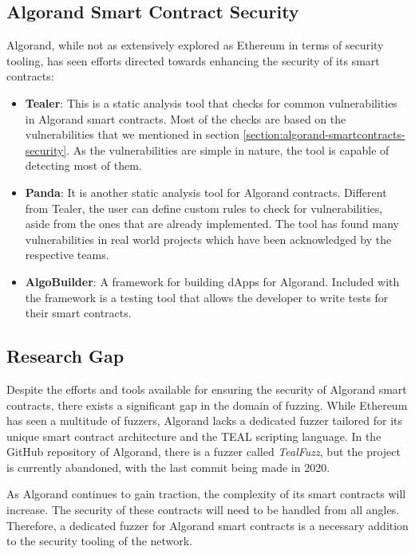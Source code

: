 \subsection*{Algorand Smart Contract Security}
Algorand, while not as extensively explored as Ethereum in terms of security tooling, has seen efforts directed towards enhancing the security of its smart contracts:
\begin{itemize}
    \item \textbf{Tealer}: This is a static analysis tool that checks for common vulnerabilities in Algorand smart contracts.
          Most of the checks are based on the vulnerabilities that we mentioned in section \ref{section:algorand-smartcontracts-security}.
          As the vulnerabilities are simple in nature, the tool is capable of detecting most of them.

    \item \textbf{Panda}: It is another static analysis tool for Algorand contracts.
          Different from Tealer, the user can define custom rules to check for vulnerabilities, aside from the ones that are already implemented.
          The tool has found many vulnerabilities in real world projects which have been acknowledged by the respective teams.
    \item \textbf{AlgoBuilder}: A framework for building \acp{dApp} for Algorand.
          Included with the framework is a testing tool that allows the developer to write tests for their smart contracts.
\end{itemize}

\subsection*{Research Gap}
Despite the efforts and tools available for ensuring the security of Algorand smart contracts, there exists a significant gap in the domain of fuzzing.
While Ethereum has seen a multitude of fuzzers, Algorand lacks a dedicated fuzzer tailored for its unique smart contract architecture and the TEAL scripting language.
In the GitHub repository of Algorand, there is a fuzzer called \textit{TealFuzz}, but the project is currently abandoned, with the last commit being made in 2020.

As Algorand continues to gain traction, the complexity of its smart contracts will increase.
The security of these contracts will need to be handled from all angles.
Therefore, a dedicated fuzzer for Algorand smart contracts is a necessary addition to the security tooling of the network.